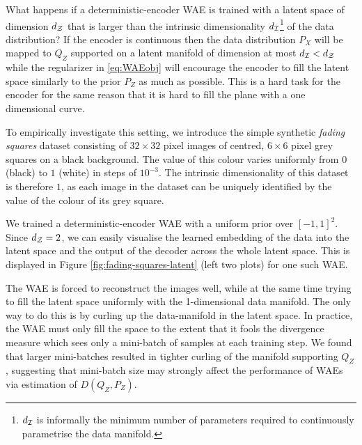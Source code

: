 What happens if a deterministic-encoder WAE is trained with a latent space of dimension $d_{\mathcal{Z}}$ that is larger than the intrinsic dimensionality $d_\mathcal{I}$\footnote{
	$d_\mathcal{I}$ is informally the minimum number of parameters required to continuously parametrise the data manifold.
} of the data distribution? If the encoder is continuous then the data distribution $P_X$ will be mapped to $Q_Z$ supported on a latent manifold of dimension at most $d_\mathcal{I} < d_{\mathcal{Z}}$ while the regularizer in \eqref{eq:WAEobj} will encourage the encoder to fill the latent space similarly to the prior $P_Z$ as much as possible.
This is a hard task for the encoder for the same reason that it is hard to fill the plane with a one dimensional curve.

To empirically investigate this setting, we introduce the simple synthetic \emph{fading squares} dataset consisting of $32 \times 32$ pixel images of centred, $6\times 6$ pixel grey squares on a black background. The value of this colour varies uniformly from $0$ (black) to $1$ (white) in steps of $10^{-3}$. The intrinsic dimensionality of this dataset is therefore $1$, as each image in the dataset can be uniquely identified by the value of the colour of its grey square. 

We trained a deterministic-encoder WAE with a uniform prior over $[-1, 1]^2$.
Since $d_{\mathcal{Z}}=2$, we can easily visualise the learned embedding of the data into the latent space and the output of the decoder across the whole latent space. This is displayed in Figure \ref{fig:fading-squares-latent} (left two plots) for one such WAE.

The WAE is forced to reconstruct the images well, while at the same time trying to fill the latent space uniformly with the 1-dimensional data manifold. The only way to do this is by curling up the data-manifold in the latent space. In practice, the WAE must only fill the space to the extent that it fools the divergence measure which sees only a mini-batch of samples at each training step.
We found that larger mini-batches resulted in tighter curling of the manifold supporting $Q_Z$, suggesting that mini-batch size may strongly affect the performance of WAEs via estimation of $D(Q_Z, P_Z)$.

